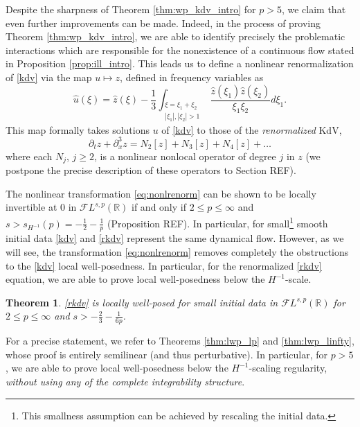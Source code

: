 \documentclass[%
11pt,  reqno]{amsart}
\newcommand{\5}{\textup{V}}
\DeclareMathOperator*{\intt}{\int}
\newtheorem{theorem}{Theorem} [section]
\theoremstyle{remark}
\newcommand{\R}{\mathbb{R}}
\numberwithin{equation}{section}
\numberwithin{theorem}{section}
\begin{document}
	\medskip
	
	Despite the sharpness of Theorem \ref{thm:wp_kdv_intro} for $p>5$, we claim that even further improvements can be made. Indeed, in the process of proving Theorem \ref{thm:wp_kdv_intro}, we are able to identify precisely the problematic interactions which are responsible for the nonexistence of a continuous flow stated in Proposition \ref{prop:ill_intro}. This leads us to define a nonlinear renormalization of \eqref{kdv} via the map $u\mapsto z$, defined in frequency variables as
	\begin{equation}\label{eq:nonlrenorm}
		\widehat{u}(\xi)=\widehat{z}(\xi) - \frac{1}{3}	\intt_{\substack{\xi=\xi_1+\xi_2\\|\xi_1|, |\xi_2|>1}}\frac{\widehat{z}( \xi_1) \widehat{z}(\xi_2)}{\xi_1\xi_2}  d\xi_1.
	\end{equation}
	This map formally takes solutions $u$ of \eqref{kdv} to those of the \emph{renormalized} KdV,
	\begin{equation}\label{rkdv}\tag{KdV*}
		\partial_t z + \partial_x^3 z = N_2[z] + N_3[z] + N_4[z]+ \dots
	\end{equation}
	where each $N_j$, $j\ge 2$, is a nonlinear nonlocal operator of degree $j$ in $z$ (we postpone the precise description of these operators to Section REF). 
	
	The nonlinear transformation \eqref{eq:nonlrenorm} can be shown to be locally invertible at 0 in $\mathcal{F}L^{s,p}(\R)$ if and only if $2\le p\le \infty$ and $s>s_{H^{-1}}(p)=-\frac12 -\frac 1p$ (Proposition REF). In particular, for small\footnote{This smallness assumption can be achieved by rescaling the initial data.} smooth initial data \eqref{kdv} and \eqref{rkdv} represent the same dynamical flow.
	However, as we will see, the transformation \eqref{eq:nonlrenorm} removes completely the obstructions to the \eqref{kdv} local well-posedness. In particular, for the renormalized \eqref{rkdv} equation, we are able to prove local well-posedness below the $H^{-1}$-scale.
	
	\begin{theorem}\label{thm:lwp_rkdv}
		\eqref{rkdv} is locally well-posed for small initial data in $\mathcal{F}L^{s,p}(\R)$ for $2\le p \le \infty$ and $s>-\frac23 - \frac 1{6p}$.
	\end{theorem}
	
	\medskip
	
	
	For a precise statement, we refer to Theorems \ref{thm:lwp_lp} and \ref{thm:lwp_linfty}, whose proof is entirely semilinear (and thus perturbative). In particular, for $p>5$, we are able to prove local well-posedness below the $H^{-1}$-scaling regularity, \emph{without using any of the complete integrability structure}.
	
\end{document}
